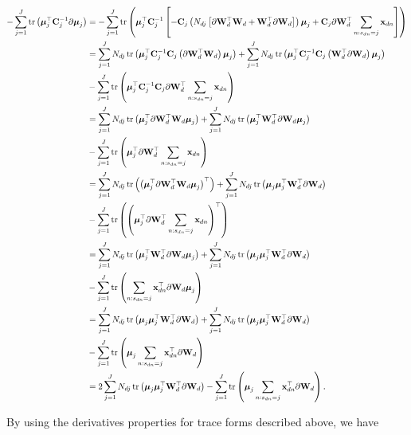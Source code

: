 \documentclass[]{article}
\newcommand{\tr}{\operatorname{tr}}
\newcommand{\Cin}{\mathbf{C}_j}
\newcommand{\muJ}{\boldsymbol{\mu}_j}
\newcommand{\indobj}{\mathbf{x}_{dn}}
\newcommand{\projMatI}{\mathbf{W}_d}
\begin{document}
\begin{align}
-\sum_{j=1}^{J}\tr\left( \muJ^\top\Cin^{-1}\partial\muJ\right) &=-\sum_{j=1}^{J}\tr\left( \muJ^\top\Cin^{-1}\left[-\Cin\left(N_{dj}\left[\partial\projMatI^\top\projMatI+\projMatI^\top\partial\projMatI\right]\right)\muJ+\Cin\partial\projMatI^\top\sum_{n:s_{dn}=j}\indobj\right]\right) \notag \\
&= \sum_{j=1}^{J}N_{dj}\tr\left(\muJ^\top\Cin^{-1}\Cin\left(\partial\projMatI^\top\projMatI\right)\muJ\right) +  \sum_{j=1}^{J}N_{dj}\tr\left(\muJ^\top\Cin^{-1}\Cin\left(\projMatI^\top\partial\projMatI\right)\muJ\right) \notag\\
&-\sum_{j=1}^{J}\tr\left(\muJ^\top\Cin^{-1}\Cin\partial\projMatI^\top\sum_{n:s_{dn}=j}\indobj\right) \notag \\
&= \sum_{j=1}^{J}N_{dj}\tr\left(\muJ^\top\partial\projMatI^\top\projMatI\muJ\right) +  \sum_{j=1}^{J}N_{dj}\tr\left(\muJ^\top\projMatI^\top\partial\projMatI\muJ\right) \notag\\
&-\sum_{j=1}^{J}\tr\left(\muJ^\top\partial\projMatI^\top\sum_{n:s_{dn}=j}\indobj\right) \notag \\
&= \sum_{j=1}^{J}N_{dj}\tr\left(\left(\muJ^\top\partial\projMatI^\top\projMatI\muJ\right)^\top\right) +  \sum_{j=1}^{J}N_{dj}\tr\left(\muJ\muJ^\top\projMatI^\top\partial\projMatI\right) \notag\\
&-\sum_{j=1}^{J}\tr\left(\left(\muJ^\top\partial\projMatI^\top\sum_{n:s_{dn}=j}\indobj\right)^\top\right) \notag \\
&= \sum_{j=1}^{J}N_{dj}\tr\left(\muJ^\top\projMatI^\top\partial\projMatI\muJ\right) +  \sum_{j=1}^{J}N_{dj}\tr\left(\muJ\muJ^\top\projMatI^\top\partial\projMatI\right) \notag\\
&-\sum_{j=1}^{J}\tr\left(\sum_{n:s_{dn}=j}\indobj^\top\partial\projMatI\muJ\right) \notag \\
&= \sum_{j=1}^{J}N_{dj}\tr\left(\muJ\muJ^\top\projMatI^\top\partial\projMatI\right) +  \sum_{j=1}^{J}N_{dj}\tr\left(\muJ\muJ^\top\projMatI^\top\partial\projMatI\right) \notag\\
&-\sum_{j=1}^{J}\tr\left(\muJ\sum_{n:s_{dn}=j}\indobj^\top\partial\projMatI\right) \notag \\
&= 2\sum_{j=1}^{J}N_{dj}\tr\left(\muJ\muJ^\top\projMatI^\top\partial\projMatI\right)-\sum_{j=1}^{J}\tr\left(\muJ\sum_{n:s_{dn}=j}\indobj^\top\partial\projMatI\right) .
\end{align}


By using the derivatives properties for trace forms described above, we have
\end{document}
